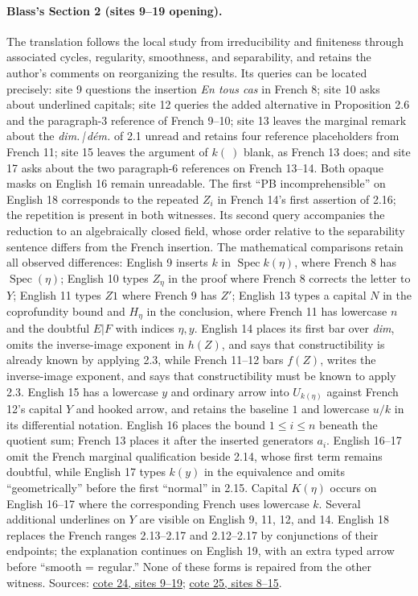 \paragraph{Blass's Section 2 (sites 9--19 opening).}
The translation follows the local study from irreducibility and finiteness through associated cycles, regularity, smoothness, and separability, and retains the author's comments on reorganizing the results. Its queries can be located precisely: site 9 questions the insertion \emph{En tous cas} in French 8; site 10 asks about underlined capitals; site 12 queries the added alternative in Proposition 2.6 and the paragraph-3 reference of French 9--10; site 13 leaves the marginal remark about the \emph{dim.\,|\,dém.} of 2.1 unread and retains four reference placeholders from French 11; site 15 leaves the argument of $k(\ )$ blank, as French 13 does; and site 17 asks about the two paragraph-6 references on French 13--14. Both opaque masks on English 16 remain unreadable. The first ``PB incomprehensible'' on English 18 corresponds to the repeated $Z_i$ in French 14's first assertion of 2.16; the repetition is present in both witnesses. Its second query accompanies the reduction to an algebraically closed field, whose order relative to the separability sentence differs from the French insertion. The mathematical comparisons retain all observed differences: English 9 inserts $k$ in $\operatorname{Spec}k(\eta)$, where French 8 has $\operatorname{Spec}(\eta)$; English 10 types $Z_\eta$ in the proof where French 8 corrects the letter to $Y$; English 11 types $Z1$ where French 9 has $Z'$; English 13 types a capital $N$ in the coprofundity bound and $H_\eta$ in the conclusion, where French 11 has lowercase $n$ and the doubtful $E|F$ with indices $\eta,y$. English 14 places its first bar over \emph{dim}, omits the inverse-image exponent in $h(Z)$, and says that constructibility is already known by applying 2.3, while French 11--12 bars $f(Z)$, writes the inverse-image exponent, and says that constructibility must be known to apply 2.3. English 15 has a lowercase $y$ and ordinary arrow into $U_{k(\eta)}$ against French 12's capital $Y$ and hooked arrow, and retains the baseline $1$ and lowercase $u/k$ in its differential notation. English 16 places the bound $1\leq i\leq n$ beneath the quotient sum; French 13 places it after the inserted generators $a_i$. English 16--17 omit the French marginal qualification beside 2.14, whose first term remains doubtful, while English 17 types $k(y)$ in the equivalence and omits ``geometrically'' before the first ``normal'' in 2.15. Capital $K(\eta)$ occurs on English 16--17 where the corresponding French uses lowercase $k$. Several additional underlines on $Y$ are visible on English 9, 11, 12, and 14. English 18 replaces the French ranges 2.13--2.17 and 2.12--2.17 by conjunctions of their endpoints; the explanation continues on English 19, with an extra typed arrow before ``smooth = regular.'' None of these forms is repaired from the other witness. Sources: \href{https://grothendieck.umontpellier.fr/web/viewer.html?file=../24.pdf\#page=10}{cote 24, sites 9--19}; \href{https://grothendieck.umontpellier.fr/web/viewer.html?file=../25.pdf\#page=9}{cote 25, sites 8--15}.

